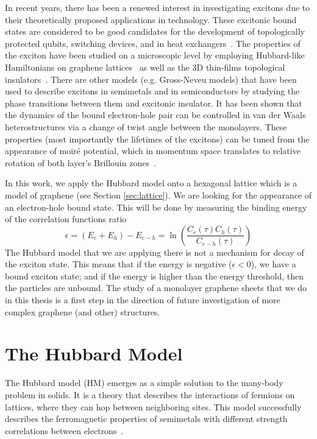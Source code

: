 In recent years, there has been a renewed interest in investigating excitons due to their theoretically proposed applications in technology. These excitonic bound states are considered to be good candidates for the development of topologically protected qubits, switching devices, and in heat exchangers~\cite{graphapl1, graphapl2, graphapl3}. The properties of the exciton have been studied on a microscopic level by employing Hubbard-like Hamiltonians on graphene lattices~\cite{graphene1, graphene2} as well as the 3D thin-films topological insulators~\cite{graphene3, graphene4, graphene5}. There are other models (e.g. Gross-Neveu models) that have been used to describe excitons in semimetals and in semiconductors by studying the phase transitions between them and excitonic insulator. It has been shown that the dynamics of the bound electron-hole pair can be controlled in van der Waals heterostructures via a change of twist angle between the monolayers. These properties (most importantly the lifetimes of the excitons) can be tuned from the appearance of moiré potential, which in momentum space translates to relative rotation of both layer's Brillouin zones~\cite{twistangle}.

In this work, we apply the Hubbard model onto a hexagonal lattice which is a model of graphene (see Section \ref{sec:lattice}). We are looking for the appearance of an electron-hole bound state. This will be done by measuring the binding energy of the correlation functions ratio
\begin{equation}
    \epsilon = (E_e + E_h) - E_{e-h} = \ln\left( \frac{C_e(\tau)C_h(\tau)}{C_{e-h}(\tau)} \right)
\end{equation}
The Hubbard model that we are applying there is not a mechanism for decay of the exciton state. This means that if the energy is negative ($\epsilon < 0$), we have a bound exciton state; and if the energy is higher than the energy threshold, then the particles are unbound. The study of a monolayer graphene sheets that we do in this thesis is a first step in the direction of future investigation of more complex graphene (and other) structures.

\section{The Hubbard Model}

The Hubbard model (HM) emerges as a simple solution to the many-body problem in solids. It is a theory that describes the interactions of fermions on lattices, where they can hop between neighboring sites. This model successfully describes the ferromagnetic properties of semimetals with different strength correlations between electrons~\cite{hubex1, hubex2}. %

